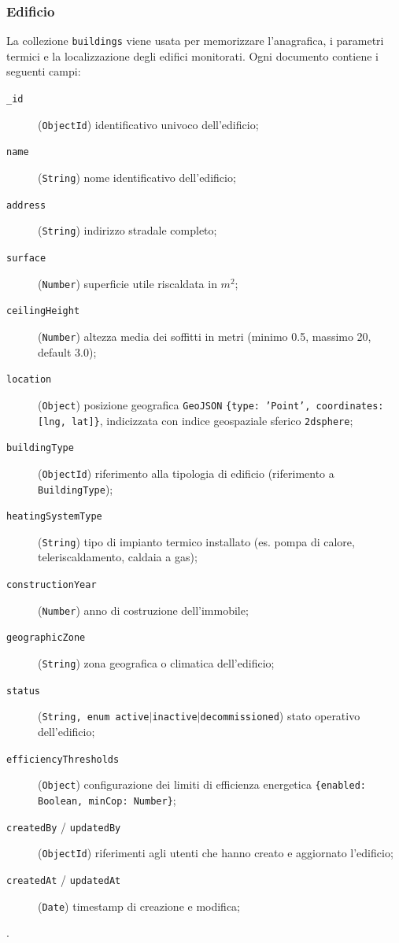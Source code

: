     \subsubsection{Edificio}
        La collezione \texttt{buildings} viene usata per memorizzare
        l'anagrafica, i parametri termici e la localizzazione degli edifici monitorati. Ogni documento contiene i seguenti campi:
        \begin{description}
            \item[\texttt{\_id}] (\texttt{ObjectId}) identificativo univoco dell'edificio;
            \item[\texttt{name}] (\texttt{String}) nome identificativo dell'edificio;
            \item[\texttt{address}] (\texttt{String}) indirizzo stradale completo;
            \item[\texttt{surface}] (\texttt{Number}) superficie utile riscaldata in \(m^2\);
            \item[\texttt{ceilingHeight}] (\texttt{Number}) altezza media dei soffitti in metri (minimo 0.5, massimo 20, default 3.0);
            \item[\texttt{location}] (\texttt{Object}) posizione geografica \texttt{GeoJSON} \texttt{\{type: 'Point', coordinates: [lng, lat]\}}, indicizzata con indice geospaziale sferico \texttt{2dsphere};
            \item[\texttt{buildingType}] (\texttt{ObjectId}) riferimento alla tipologia di edificio (riferimento a \texttt{BuildingType});
            \item[\texttt{heatingSystemType}] (\texttt{String}) tipo di impianto termico installato (es. pompa di calore, teleriscaldamento, caldaia a gas);
            \item[\texttt{constructionYear}] (\texttt{Number}) anno di costruzione dell'immobile;
            \item[\texttt{geographicZone}] (\texttt{String}) zona geografica o climatica dell'edificio;
            \item[\texttt{status}] (\texttt{String, enum \texttt{active}$|$\texttt{inactive}$|$\texttt{decommissioned}}) stato operativo dell'edificio;
            \item[\texttt{efficiencyThresholds}] (\texttt{Object}) configurazione dei limiti di efficienza energetica \texttt{\{enabled: Boolean, minCop: Number\}};
            \item[\texttt{createdBy} / \texttt{updatedBy}] (\texttt{ObjectId}) riferimenti agli utenti che hanno creato e aggiornato l'edificio;
            \item[\texttt{createdAt} / \texttt{updatedAt}] (\texttt{Date}) timestamp di creazione e modifica;
        \end{description}.
